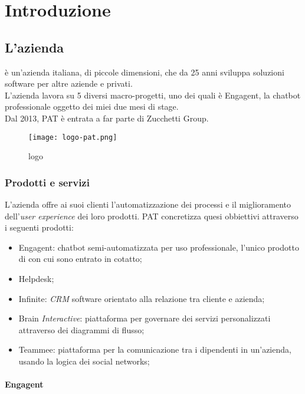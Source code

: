 
\chapter{Introduzione}
\label{cap:introduzione}
\section{L'azienda}

\company è un'azienda italiana, di piccole dimensioni, che da 25 anni sviluppa soluzioni software per altre aziende e privati.\\
L'azienda lavora su 5 diversi macro-progetti, uno dei quali è Engagent, la chatbot professionale oggetto dei miei due mesi di stage.\\
Dal 2013, PAT è entrata a far parte di Zucchetti Group.
\begin{figure}[H]
    \centering
    \texttt{[image: logo-pat.png]} 
    \caption{logo \company}
    \label{logo:company}
\end{figure}

\subsection{Prodotti e servizi}
L'azienda offre ai suoi clienti l'automatizzazione dei processi e il miglioramento dell'\textit{user experience} dei loro prodotti.
PAT concretizza quesi obbiettivi attraverso i seguenti prodotti:
\begin{itemize}
    \item Engagent: chatbot semi-automatizzata per uso professionale, l'unico prodotto di \company con cui sono entrato in cotatto; 
    \item Helpdesk;
    \item Infinite: \textit{CRM} software orientato alla relazione tra cliente e azienda;
    \item Brain \textit{Interactive}: piattaforma per governare dei servizi personalizzati attraverso dei diagrammi di flusso; 
    \item Teammee: piattaforma per la comunicazione tra i dipendenti in un'azienda, usando la logica dei social networks;
\end{itemize}

\subsubsection{Engagent}

